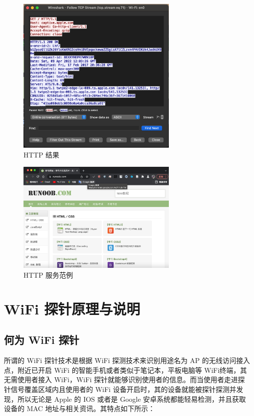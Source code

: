 \begin{figure}[htb]
\centering 
\includegraphics[width=0.70\textwidth]{img/ch1s4m8.png} 
\caption{HTTP 结果}
\label{Test}
\end{figure}

\begin{figure}[htb]
\centering 
\includegraphics[width=0.70\textwidth]{img/ch1s4m9.png} 
\caption{HTTP 服务范例}
\label{Test}
\end{figure}


\section{WiFi 探针原理与说明}

\subsection{何为 WiFi 探针}

所谓的 WiFi 探针技术是根据 WiFi 探测技术来识别用途名为 AP 的无线访问接入点，附近已开启 WiFi 的智能手机或者类似于笔记本，平板电脑等 WiFi终端，其无需使用者接入 WiFi，WiFi 探针就能够识别使用者的信息。而当使用者走进探针信号覆盖区域内且使用者的 WiFi 设备开启时，其的设备就能被探针探测并发现，所以无论是 Apple 的 IOS 或者是 Google 安卓系统都能轻易检测，并且获取设备的 MAC 地址与相关资讯。其特点如下所示：

